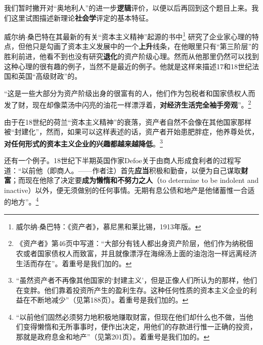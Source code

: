 \documentclass[fontset=fandol, a4paper, 12pt, openright]{ctexbook}
\begin{document}
我们暂时撇开对“奥地利人”的进一步\textbf{逻辑}评价，以便以后再回到这个题目上来。我们这里试图描述新理论\textbf{社会学}评定的基本特征。

威尔纳$\cdot$桑巴特在其最新的有关“资本主义精神”起源的书中\footnote{威尔纳$\cdot$桑巴特：《资产者》，慕尼黑和莱比锡，1913年版。} 研究了企业家心理的特点，但他只是勾画了资本主义发展中的一个\textbf{上升}线条，在他眼里只有“第三阶层”的胜利前进，他看不到也没有研究\textbf{退化}的资产阶级心理。然而从他那里仍然可以找到这种心理的很有趣的例子，当然不是最近的例子。他就是这样来描述17和18世纪法国和英国“高级财政”的。

“这是一些大部分为资产阶级出身的很富有的人，他们作为包税者和国家债权人而发了财，现在却像菜汤中闪亮的油花一样漂浮着，\textbf{对经济生活完全袖手旁观}”。\footnote{《资产者》第46页中写道：“大部分有钱人都出身资产阶层，他们作为纳税佃农或者国家债权人而致富，并且就像漂浮在海绵汤上面的油泡泡一样远离经济生活而存在”。着重号是我们加的。}

由于在18世纪的荷兰“资本主义精神”的衰落，资产者自然不会像在其他国家那样被“封建化”，然而，如果可以这样表述的话，资产者开始患肥胖症，他养尊处优，\textbf{对任何形式的资本主义企业的兴趣都越来越降低}。\footnote{“虽然资产者不再像其他国家的‘封建主义’，但是正像人们所认为的那样，他们在变胖。他们靠着投资所产生的盈利生存。这种任何性质的资本主义企业的利益在不断地减少”（见第188页）。着重号是我们加的。}

还有一个例子。18世纪下半期英国作家Defoe关于由商人形成食利者的过程写道：“以前他（即商人。——作者注）首先\textbf{应当}积极和勤奋，以便为自己谋取\textbf{财富}；而现在他除了决定要\textbf{成为懒惰和不努力之人}（to determine to be indolent and inactive）以外，便无须做别的任何事情。无期有息公债和地产是他储蓄惟一合适的地方”。\footnote{“以前他们固然必须努力地积极地赚取财富，但现在他们却什么也不做，当他们变得懒惰和无所事事时，便作出决定，用他们的存款进行惟一正确的投资，那就是政府息金和地产”（见第201页）。着重号是我们加的。}
\end{document}
